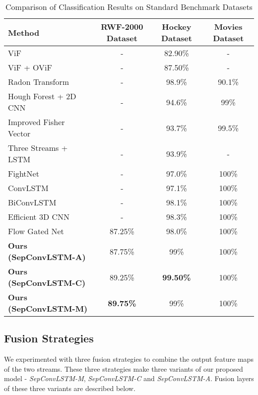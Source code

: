 \documentclass[conference]{IEEEtran}
\begin{document}
\begin{table*}[t]
\centering
\caption{Comparison of Classification Results on Standard Benchmark Datasets}
\label{table:accuracy}
\begin{tabular}{lccc}
\hline
\textbf{Method}         & \textbf{RWF-2000 Dataset}     & \textbf{Hockey Dataset}  & \textbf{Movies Dataset} \\ \hline
ViF\cite{hassnerViF}                     & -                & 82.90\%          & -               \\
ViF + OViF\cite{gao2016violence}              & -                & 87.50\%          & -               \\
Radon Transform\cite{deniz2014fast}              & -                & 98.9\%          & 90.1\%               \\
Hough Forest + 2D CNN\cite{serrano2018fight}   & -                & 94.6\%           & 99\%            \\
Improved Fisher Vector \cite{bilinski2016human}  & -                & 93.7\%           & 99.5\%          \\
Three Streams + LSTM  \cite{dong2016multi}  & -                & 93.9\%           & -               \\
FightNet \cite{zhou}               & -                & 97.0\%           & 100\%           \\
ConvLSTM \cite{sudhakaran2017learning}               & -                & 97.1\%           & 100\%           \\
BiConvLSTM \cite{hanson2018bidirectional}              & -                & 98.1\%           & 100\%           \\
Efficient 3D CNN \cite{li2019efficient}        & -                & 98.3\%           & 100\%           \\
Flow Gated Net \cite{cheng2019rwf}         & 87.25\%          & 98.0\%           & 100\%           \\
\textbf{Ours (SepConvLSTM-A)}  & 87.75\% & 99\% & 100\%           \\
\textbf{Ours (SepConvLSTM-C)}  & 89.25\% & \textbf{99.50\%} & 100\%           \\
\textbf{Ours (SepConvLSTM-M)} & \textbf{89.75\%}          & 99\%             & 100\%           \\ \hline
\end{tabular}
\end{table*}




\subsection{Fusion Strategies}
We experimented with three fusion strategies to combine the output feature maps of the two streams. These three strategies make three variants of our proposed model - \emph{SepConvLSTM-M}, \emph{SepConvLSTM-C} and \emph{SepConvLSTM-A}. Fusion layers of these three variants are described below.
 
\end{document}
